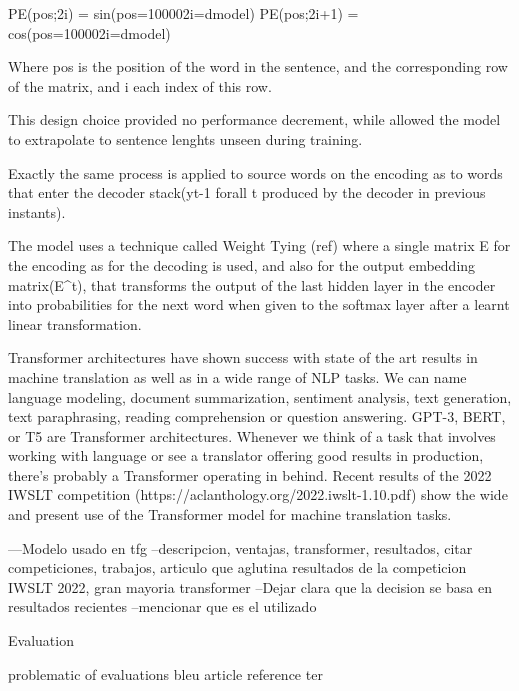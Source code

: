 \documentclass[11pt,english,listoffigures,listoftables]{tfgetsinf}
\begin{document}
PE(pos;2i) = sin(pos=100002i=dmodel)
PE(pos;2i+1) = cos(pos=100002i=dmodel)

Where pos is the position of the word in the sentence, and the corresponding row of the matrix, and i each index of this row.

This design choice provided no performance decrement, while allowed the model to extrapolate to sentence lenghts unseen during training.

Exactly the same process is applied to source words on the encoding as to words that enter the decoder stack(yt-1 forall t produced by the decoder in previous instants).

The model uses a technique called Weight Tying (ref) 
where a single matrix E for the encoding as for the decoding is used, and also for the output embedding matrix(E^t), that transforms the output of the last hidden layer in the encoder into probabilities for the next word when given to the softmax layer after a learnt linear transformation. 


%

Transformer architectures have shown success with state of the art results in machine translation as well as in a wide range of NLP tasks. We can name language modeling, document summarization, sentiment analysis, text generation, text paraphrasing, reading comprehension or question answering.
GPT-3, BERT, or T5 are Transformer architectures. Whenever we think of a task that involves working with language or see a translator offering good results in production, there's probably a Transformer operating in behind.
Recent results of the 2022 IWSLT competition (https://aclanthology.org/2022.iwslt-1.10.pdf) show the wide and present use of the Transformer model for machine translation tasks.



---Modelo usado en tfg --descripcion, ventajas, transformer, resultados, citar competiciones, trabajos, articulo que aglutina resultados de la competicion IWSLT 2022, gran mayoria transformer --Dejar clara que la decision se basa en resultados recientes --mencionar que es el utilizado

Evaluation

problematic of evaluations
bleu article reference
ter
\end{document}
